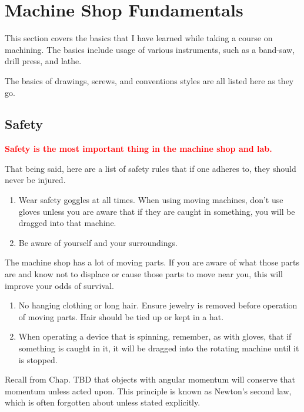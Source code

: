\chapter{Machine Shop Fundamentals}

This section covers the basics that I have learned while taking a course on machining. The basics include usage of various instruments, such as a band-saw, drill press, and lathe.

The basics of drawings, screws, and conventions styles are all listed here as they go.

\section{Safety}

\begin{center}
\Huge{\textbf{\textcolor{red}{Safety is the most important thing in the machine shop and lab.}}}    
\end{center}

That being said, here are a list of safety rules that if one adheres to, they should never be injured.

\begin{enumerate}
    \item Wear safety goggles at all times. When using moving machines, don't use gloves unless you are aware that if they are caught in something, you will be dragged into that machine. 
    \item Be aware of yourself and your surroundings. 
\end{enumerate}

The machine shop has a lot of moving parts. If you are aware of what those parts are and know not to displace or cause those parts to move near you, this will improve your odds of survival. 

\begin{enumerate} [resume]
    \item No hanging clothing or long hair. Ensure jewelry is removed before operation of moving parts. Hair should be tied up or kept in a hat.
    \item When operating a device that is spinning, remember, as with gloves, that if something is caught in it, it will be dragged into the rotating machine until it is stopped. 
\end{enumerate}

Recall from Chap. TBD that objects with angular momentum will conserve that momentum unless acted upon. This principle is known as Newton's second law, which is often forgotten about unless stated explicitly.

